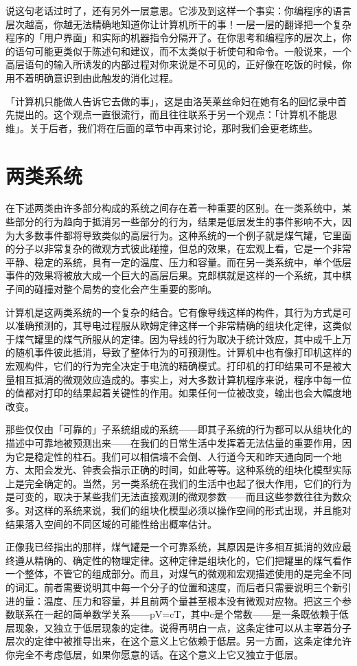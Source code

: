 \documentclass[
  12pt,
  twoside,
  openright,
  oldfontcommands,
]{memoir}
\begin{document}
说这句老话过时了，还有另外一层意思。它涉及到这样一个事实：你编程序的语言层次越高，你越无法精确地知道你让计算机所干的事！一层一层的翻译把一个复杂程序的「用户界面」和实际的机器指令分隔开了。在你思考和编程序的层次上，你的语句可能更类似于陈述句和建议，而不太类似于祈使句和命令。一般说来，一个高层语句的输入所诱发的内部过程对你来说是不可见的，正好像在吃饭的时候，你用不着明确意识到由此触发的消化过程。

「计算机只能做人告诉它去做的事」，这是由洛芙莱丝命妇在她有名的回忆录中首先提出的。这个观点一直很流行，而且往往联系于另一个观点：「计算机不能思维」。关于后者，我们将在后面的章节中再来讨论，那时我们会更老练些。

\section{两类系统}

在下述两类由许多部分构成的系统之间存在着一种重要的区别。在一类系统中，某些部分的行为趋向于抵消另一些部分的行为，结果是低层发生的事件影响不大，因为大多数事件都将导致类似的高层行为。这种系统的一个例子就是煤气罐，它里面的分子以非常复杂的微观方式彼此碰撞，但总的效果，在宏观上看，它是一个非常平静、稳定的系统，具有一定的温度、压力和容量。而在另一类系统中，单个低层事件的效果将被放大成一个巨大的高层后果。克郎棋就是这样的一个系统，其中棋子间的碰撞对整个局势的变化会产生重要的影响。

计算机是这两类系统的一个复杂的结合。它有像导线这样的构件，其行为方式是可以准确预测的，其导电过程服从欧姆定律这样一个非常精确的组块化定律，这类似于煤气罐里的煤气所服从的定律。因为导线的行为取决于统计效应，其中成千上万的随机事件彼此抵消，导致了整体行为的可预测性。计算机中也有像打印机这样的宏观构件，它们的行为完全决定于电流的精确模式。打印机的打印结果可不是被大量相互抵消的微观效应造成的。事实上，对大多数计算机程序来说，程序中每一位的值都对打印的结果起着关键性的作用。如果任何一位被改变，输出也会大幅度地改变。

那些仅仅由「可靠的」子系统组成的系统------即其子系统的行为都可以从组块化的描述中可靠地被预测出来------在我们的日常生活中发挥着无法估量的重要作用，因为它是稳定性的柱石。我们可以相信墙不会倒、人行道今天和昨天通向同一个地方、太阳会发光、钟表会指示正确的时间，如此等等。这种系统的组块化模型实际上是完全确定的。当然，另一类系统在我们的生活中也起了很大作用，它们的行为是可变的，取决于某些我们无法直接观测的微观参数------而且这些参数往往为数众多。对这样的系统来说，我们的组块化模型必须以操作空间的形式出现，并且能对结果落入空间的不同区域的可能性给出概率估计。

正像我已经指出的那样，煤气罐是一个可靠系统，其原因是许多相互抵消的效应最终遵从精确的、确定性的物理定律。这种定律是组块化的，它们把罐里的煤气看作一个整体，不管它的组成部分。而且，对煤气的微观和宏观描述使用的是完全不同的词汇。前者需要说明其中每一个分子的位置和速度，而后者只需要说明三个新引进的量：温度、压力和容量，并且前两个量甚至根本没有微观对应物。把这三个参数联系在一起的简单数学关系------pV=cT，其中c是个常数------是一条既依赖于低层现象，又独立于低层现象的定律。说得再明白一点，这条定律可以从主宰着分子层次的定律中被推导出来，在这个意义上它依赖于低层。另一方面，这条定律允许你完全不考虑低层，如果你愿意的话。在这个意义上它又独立于低层。
\end{document}
